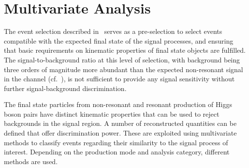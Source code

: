 \section{Multivariate Analysis}%
\label{sec:multivariate_analysis}

The event selection described in~ serves as
a pre-selection to select events compatible with the expected final
state of the signal processes, and ensuring that basic requirements on
kinematic properties of final state objects are fulfilled. %
The signal-to-background ratio at this level of selection, with
background being three orders of magnitude more abundant than the
expected non-resonant \HH signal in the \hadhad channel
(cf.~), is not sufficient to provide
any signal sensitivity without further signal-background
discrimination.

The final state particles from non-resonant and resonant production of
Higgs boson pairs have distinct kinematic properties that can be used
to reject backgrounds in the signal region.
A number of reconstructed quantities can be defined that offer
discrimination power. These are exploited using multivariate methods
to classify events regarding their similarity to the signal process of
interest.
Depending on the \HH production mode and analysis category, different
methods are used.


